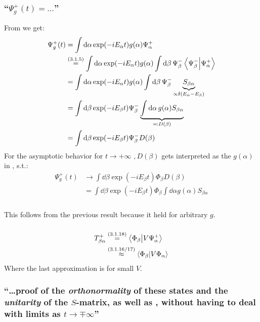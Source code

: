 \subsubsection{\enquote{$\Psi_g^+(t)=\dots$} }
From  we get:
\begin{align*}
	\Psi^+_g(t)&=\int \dd{\alpha} \exp(-iE_\alpha t) g(\alpha) \Psi_\alpha^+\\
	&\overset{\eqc{3.1.5}}{=}\int \dd{\alpha} \exp(-iE_\alpha t) g(\alpha) \int\dd{\beta} \Psi_\beta^- \innerproduct{\Psi_\beta^-}{\Psi_\alpha^+}\\
	&=\int \dd{\alpha} \exp(-iE_\alpha t) g(\alpha) \int\dd{\beta} \Psi_\beta^- \underbrace{S_{\beta\alpha}}_{\propto \delta(E_\alpha-E_\beta)}\\
	&=\int \dd{\beta} \exp(-iE_\beta t)\Psi_\beta^-  \underbrace{\int\dd{\alpha} g(\alpha) S_{\beta\alpha}}_{\eqqcolon D(\beta)}\\
	&=\int \dd{\beta} \exp(-iE_\beta t)\Psi_\beta^-  D(\beta)
\end{align*}
For the asymptotic behavior for $t\rightarrow + \infty$ $, D(\beta)$ gets interpreted as the $g(\alpha)$ in , s.t.:
\begin{align*}
		\Psi^+_g(t)&\rightarrow \int \dd{\beta} \exp(-iE_\beta t)\Phi_\beta  D(\beta)\\
		&= \int \dd{\beta} \exp(-iE_\beta t)\Phi_\beta \int\dd{\alpha} g(\alpha) S_{\beta\alpha}
\end{align*}


\subsubsection{ }
This follows from the previous result because it held for arbitrary $g$.


\subsubsection{ }
\begin{align*}
	T_{\beta\alpha}^+&\overset{\eqc{3.1.18}}{=} \innerproduct{\Phi_\beta}{V\Psi_\alpha^+}\\
	&\overset{\eqc{3.1.16/17}}{\approx}\innerproduct{\Phi_\beta}{V\Phi_\alpha}
\end{align*}
Where the last approximation is for small $V$.


\subsubsection{\enquote{\dots proof of the \emph{orthonormality} of these states and the \emph{unitarity} of the $S$-matrix, as well as , without having to deal with limits as $t\rightarrow \mp\infty$} }

